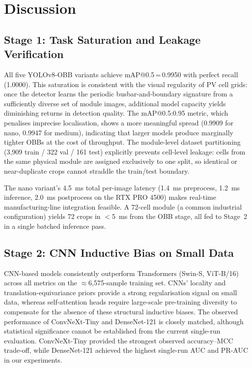 \documentclass[conference]{IEEEtran}
\begin{document}
\section{Discussion}
\label{sec:discussion}

\subsection{Stage 1: Task Saturation and Leakage Verification}

All five YOLOv8-OBB variants achieve mAP@0.5\,=\,0.9950 with perfect recall (1.0000). This saturation is consistent with the visual regularity of PV cell grids: once the detector learns the periodic busbar-and-boundary signature from a sufficiently diverse set of module images, additional model capacity yields diminishing returns in detection quality. The mAP@0.5:0.95 metric, which penalises imprecise localisation, shows a more meaningful spread (0.9909 for nano, 0.9947 for medium), indicating that larger models produce marginally tighter OBBs at the cost of throughput. The module-level dataset partitioning (3{,}909 train / 322 val / 161 test) explicitly prevents cell-level leakage: cells from the same physical module are assigned exclusively to one split, so identical or near-duplicate crops cannot straddle the train/test boundary.

The nano variant's 4.5~ms total per-image latency (1.4~ms preprocess, 1.2~ms inference, 2.0~ms postprocess on the RTX PRO 4500) makes real-time manufacturing-line integration feasible. A 72-cell module (a common industrial configuration) yields 72 crops in $<$5~ms from the OBB stage, all fed to Stage~2 in a single batched inference pass.

\subsection{Stage 2: CNN Inductive Bias on Small Data}

CNN-based models consistently outperform Transformers (Swin-S, ViT-B/16) across all metrics on the $\approx$6{,}575-sample training set. CNNs' locality and translation-equivariance priors provide a strong regularisation signal on small data, whereas self-attention heads require large-scale pre-training diversity to compensate for the absence of these structural inductive biases. The observed performance of ConvNeXt-Tiny and DenseNet-121 is closely matched, although statistical significance cannot be established from the current single-run evaluation. ConvNeXt-Tiny provided the strongest observed accuracy--MCC trade-off, while DenseNet-121 achieved the highest single-run AUC and PR-AUC in our experiments.
\end{document}
